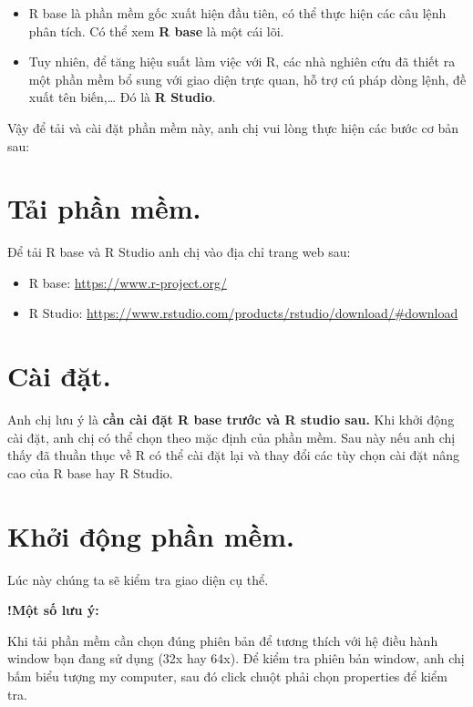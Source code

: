 \documentclass[
]{book}
\theoremstyle{definition}
\theoremstyle{definition}
\theoremstyle{definition}
\theoremstyle{definition}
\theoremstyle{remark}
\begin{document}
\begin{itemize}
\item
  R base là phần mềm gốc xuất hiện đầu tiên, có thể thực hiện các câu lệnh phân tích. Có thể xem \textbf{R base} là một cái lõi.
\item
  Tuy nhiên, để tăng hiệu suất làm việc với R, các nhà nghiên cứu đã thiết ra một phần mềm bổ sung với giao diện trực quan, hỗ trợ cú pháp dòng lệnh, đề xuất tên biến,\ldots{} Đó là \textbf{R Studio}.
\end{itemize}

Vậy để tải và cài đặt phần mềm này, anh chị vui lòng thực hiện các bước cơ bản sau:

\hypertarget{tux1ea3i-phux1ea7n-mux1ec1m.}{%
\section{Tải phần mềm.}\label{tux1ea3i-phux1ea7n-mux1ec1m.}}

Để tải R base và R Studio anh chị vào địa chỉ trang web sau:

\begin{itemize}
\item
  R base: \url{https://www.r-project.org/}
\item
  R Studio: \url{https://www.rstudio.com/products/rstudio/download/\#download}
\end{itemize}

\hypertarget{cuxe0i-ux111ux1eb7t.}{%
\section{Cài đặt.}\label{cuxe0i-ux111ux1eb7t.}}

Anh chị lưu ý là \textbf{cần cài đặt R base trước và R studio sau.} Khi khởi động cài đặt, anh chị có thể chọn theo mặc định của phần mềm. Sau này nếu anh chị thấy đã thuần thục về R có thể cài đặt lại và thay đổi các tùy chọn cài đặt nâng cao của R base hay R Studio.

\hypertarget{khux1edfi-ux111ux1ed9ng-phux1ea7n-mux1ec1m.}{%
\section{Khởi động phần mềm.}\label{khux1edfi-ux111ux1ed9ng-phux1ea7n-mux1ec1m.}}

Lúc này chúng ta sẽ kiểm tra giao diện cụ thể.

\textbf{!Một số lưu ý:}

Khi tải phần mềm cần chọn đúng phiên bản để tương thích với hệ điều hành window bạn đang sử dụng (32x hay 64x). Để kiểm tra phiên bản window, anh chị bấm biểu tượng my computer, sau đó click chuột phải chọn properties để kiểm tra.
\end{document}
